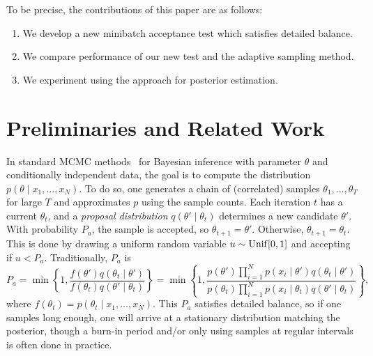 \documentclass{article}
\begin{document}
To be precise, the contributions of this paper are as follows:

\begin{enumerate}[noitemsep]
    \item We develop a new minibatch acceptance test which satisfies detailed balance.
    \item We compare performance of our new test and the adaptive sampling method.
    \item We experiment using the approach for posterior estimation.
\end{enumerate}




\section{Preliminaries and Related Work}\label{sec:related_work}

In standard MCMC methods~\cite{gilks1996markov,brooks2011handbook} for Bayesian inference with
parameter $\theta$ and conditionally independent data, the goal is to compute the distribution
$p(\theta \mid x_1, \ldots, x_N)$.  To do so, one generates a chain of (correlated) samples
$\theta_1, \ldots, \theta_T$ for large $T$ and approximates $p$ using the sample counts.  Each
iteration $t$ has a current $\theta_t$, and a \emph{proposal distribution} $q(\theta' \mid
\theta_t)$ determines a new candidate $\theta'$. With probability $P_a$, the sample is accepted, so
$\theta_{t+1} = \theta'$. Otherwise, $\theta_{t+1} = \theta_t$. This is done by drawing a uniform
random variable $u \sim {\rm Unif}[0,1]$ and accepting if $u < P_a$. Traditionally, $P_a$ is
\begin{equation}\label{eq:traditional}
P_a = \min\left\{ 1, \frac{f(\theta')q(\theta_t \mid \theta')}{f(\theta_t)q(\theta' \mid \theta_t)}
\right\} = \min\left\{ 1, \frac{p(\theta')\prod_{i=1}^N p(x_i \mid \theta')q(\theta_t \mid
\theta')}{p(\theta_t)\prod_{i=1}^N p(x_i \mid \theta_t)q(\theta' \mid
\theta_t)} \right\},
\end{equation}
where $f(\theta_t)=p(\theta_t \mid x_1,\ldots,x_N)$. This $P_a$ satisfies detailed balance, so if
one samples long enough, one will arrive at a stationary distribution matching the posterior, though
a burn-in period and/or only using samples at regular intervals is often done in practice.
\end{document}
